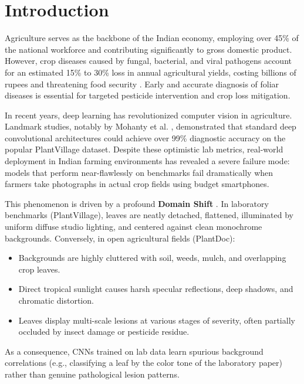 \documentclass[twoside,a4paper,11pt]{article}
\begin{document}
\section{Introduction}

Agriculture serves as the backbone of the Indian economy, employing over 45\% of the national workforce and contributing significantly to gross domestic product. However, crop diseases caused by fungal, bacterial, and viral pathogens account for an estimated 15\% to 30\% loss in annual agricultural yields, costing billions of rupees and threatening food security \cite{Singh:20}. Early and accurate diagnosis of foliar diseases is essential for targeted pesticide intervention and crop loss mitigation.

In recent years, deep learning has revolutionized computer vision in agriculture. Landmark studies, notably by Mohanty et al. \cite{Mohanty:16}, demonstrated that standard deep convolutional architectures could achieve over 99\% diagnostic accuracy on the popular PlantVillage dataset. Despite these optimistic lab metrics, real-world deployment in Indian farming environments has revealed a severe failure mode: models that perform near-flawlessly on benchmarks fail dramatically when farmers take photographs in actual crop fields using budget smartphones.

This phenomenon is driven by a profound \textbf{Domain Shift} \cite{Singh:20}. In laboratory benchmarks (PlantVillage), leaves are neatly detached, flattened, illuminated by uniform diffuse studio lighting, and centered against clean monochrome backgrounds. Conversely, in open agricultural fields (PlantDoc):
\begin{itemize}
    \item Backgrounds are highly cluttered with soil, weeds, mulch, and overlapping crop leaves.
    \item Direct tropical sunlight causes harsh specular reflections, deep shadows, and chromatic distortion.
    \item Leaves display multi-scale lesions at various stages of severity, often partially occluded by insect damage or pesticide residue.
\end{itemize}

As a consequence, CNNs trained on lab data learn spurious background correlations (e.g., classifying a leaf by the color tone of the laboratory paper) rather than genuine pathological lesion patterns. 
\end{document}
